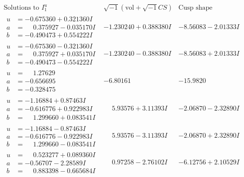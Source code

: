 \documentclass[1p]{elsarticle_modified}
\theoremstyle{definition}
\newcommand{\I}{\sqrt{-1}}
\begin{document}
$$\begin{array}{c|c|c}  
\text{Solutions to }I^u_{1}& \I (\text{vol} + \sqrt{-1}CS) & \text{Cusp shape}\\
 \hline 
\begin{aligned}
u &= -0.675360 + 0.321360 I \\
a &= \phantom{-}0.375927 - 0.035170 I \\
b &= -0.490473 + 0.554222 I\end{aligned}
 & -1.230240 + 0.388380 I & -8.56083 - 2.01333 I \\ \hline\begin{aligned}
u &= -0.675360 - 0.321360 I \\
a &= \phantom{-}0.375927 + 0.035170 I \\
b &= -0.490473 - 0.554222 I\end{aligned}
 & -1.230240 - 0.388380 I & -8.56083 + 2.01333 I \\ \hline\begin{aligned}
u &= \phantom{-}1.27629\phantom{ +0.000000I} \\
a &= -0.656695\phantom{ +0.000000I} \\
b &= -0.328475\phantom{ +0.000000I}\end{aligned}
 & -6.80161\phantom{ +0.000000I} & -15.9820\phantom{ +0.000000I} \\ \hline\begin{aligned}
u &= -1.16884 + 0.87463 I \\
a &= -0.616776 + 0.922983 I \\
b &= \phantom{-}1.299660 + 0.083541 I\end{aligned}
 & \phantom{-}5.93576 + 3.11393 I & -2.06870 - 2.32890 I \\ \hline\begin{aligned}
u &= -1.16884 - 0.87463 I \\
a &= -0.616776 - 0.922983 I \\
b &= \phantom{-}1.299660 - 0.083541 I\end{aligned}
 & \phantom{-}5.93576 - 3.11393 I & -2.06870 + 2.32890 I \\ \hline\begin{aligned}
u &= \phantom{-}0.523277 + 0.089360 I \\
a &= -0.56707 - 2.28589 I \\
b &= \phantom{-}0.883398 - 0.665684 I\end{aligned}
 & \phantom{-}0.97258 - 2.76102 I & -6.12756 + 2.10529 I \\ \hline\begin{aligned}

\end{aligned}
\end{array}$$
\end{document}

